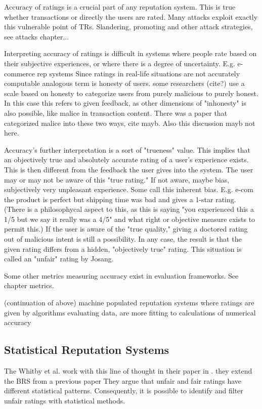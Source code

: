 \documentclass[%
    ]{\PathToTumTemplate/thesis/tum_thesis}
\begin{document}
Accuracy of ratings is a crucial part of any reputation system. This is true whether transactions or directly the users are rated. 
Many attacks exploit exactly this vulnerable point of TRs. Slandering, promoting and other attack strategies, see attacks chapter...

Interpreting accuracy of ratings is difficult in systems where people rate based on their subjective experiences, or where there is a degree of uncertainty. E.g. e-commerce rep systems
Since ratings in real-life situations are not accurately computable
analogous term is honesty of users. some researchers (cite?) use a scale based on honesty to categorize users from purely malicious to purely honest. In this case this refers to given feedback, as other dimensions of "inhonesty" is also possible, like malice in transaction content. There was a paper that categorized malice into these two ways, cite mayb. Also this discussion mayb not here.

Accuracy's further interpretation is a sort of "trueness" value. This implies that an objectively true and absolutely accurate rating of a user's experience exists.
This is then different from the feedback the user gives into the system.
The user may or may not be aware of this "true rating." If not aware, maybe bias, subjectively very unpleasant experience. Some call this inherent bias. E.g. e-com the product is perfect but shipping time was bad and gives a 1-star rating. 
(There is a philosophycal aspect to this, as this is saying "you experienced this a 1/5 but we say it really was a 4/5" and what right or objective measure exists to permit this.)
If the user is aware of the "true quality," giving a doctored rating out of malicious intent is still a possibility. 
In any case, the result is that the given rating differs from a hidden, "objectively true" rating. This situation is called an "unfair" rating by Josang.

Some other metrics measuring accuracy exist in evaluation frameworks. See chapter metrics.


(continuation of above) machine populated reputation systems where ratings are given by algorithms evaluating data, are more fitting to calculations of numerical accuracy



\subsection{Statistical Reputation Systems}

The Whitby et al. work with this line of thought in their paper in \cite{whitby_filtering_2014}. 
they extend the BRS from a previous paper
They argue that unfair and fair ratings have different statistical patterns. Consequently, it is possible to identify and filter unfair ratings with statistical methods.
\end{document}
